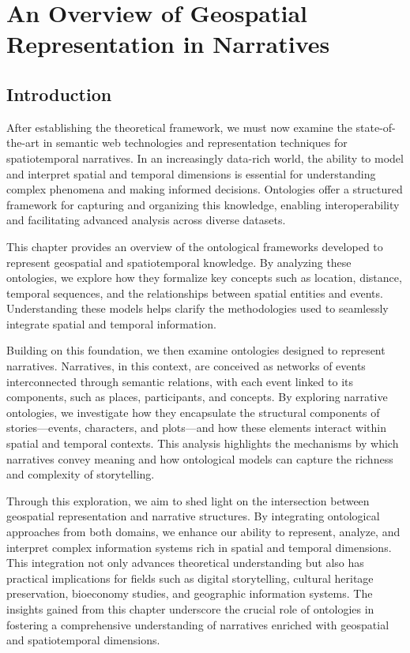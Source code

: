 
\chapter{An Overview of Geospatial Representation in Narratives}\label{chap:overview_narratives} %

\section{Introduction}\label{III-sec:introduction}

After establishing the theoretical framework, we must now examine the state-of-the-art in semantic web technologies and representation techniques for spatiotemporal narratives. In an increasingly data-rich world, the ability to model and interpret spatial and temporal dimensions is essential for understanding complex phenomena and making informed decisions. Ontologies offer a structured framework for capturing and organizing this knowledge, enabling interoperability and facilitating advanced analysis across diverse datasets.

This chapter provides an overview of the ontological frameworks developed to represent geospatial and spatiotemporal knowledge. By analyzing these ontologies, we explore how they formalize key concepts such as location, distance, temporal sequences, and the relationships between spatial entities and events. Understanding these models helps clarify the methodologies used to seamlessly integrate spatial and temporal information.

Building on this foundation, we then examine ontologies designed to represent narratives. Narratives, in this context, are conceived as networks of events interconnected through semantic relations, with each event linked to its components, such as places, participants, and concepts. By exploring narrative ontologies, we investigate how they encapsulate the structural components of stories—events, characters, and plots—and how these elements interact within spatial and temporal contexts. This analysis highlights the mechanisms by which narratives convey meaning and how ontological models can capture the richness and complexity of storytelling.

Through this exploration, we aim to shed light on the intersection between geospatial representation and narrative structures. By integrating ontological approaches from both domains, we enhance our ability to represent, analyze, and interpret complex information systems rich in spatial and temporal dimensions. This integration not only advances theoretical understanding but also has practical implications for fields such as digital storytelling, cultural heritage preservation, bioeconomy studies, and geographic information systems. The insights gained from this chapter underscore the crucial role of ontologies in fostering a comprehensive understanding of narratives enriched with geospatial and spatiotemporal dimensions.

